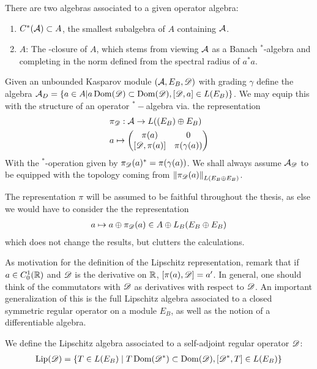 \begin{remark}
	There are two \Cstar algebras associated to a given operator algebra:
	\begin{enumerate}
	\item
	$C^*(\mathcal{A})\subset A$, the smallest subalgebra of $A$ containing $\mathcal{A}$. 
	\item
	$A$: The \Cstar-closure of $A$, which stems from viewing $\mathcal{A}$ as a Banach $^*$-algebra and completing in the norm defined from the spectral radius of $a^*a$. 
	\end{enumerate}
\end{remark}
\begin{definition}
Given an unbounded Kasparov module $(\mathcal{A},E_B,\mathscr{D})$ with grading $\gamma$ define the algebra $\mathcal{A}_D=\{a\in A| a\operatorname{Dom}(\mathscr{D}) \subset \operatorname{Dom}(\mathscr{D}), [\mathscr{D},a]\in L(E_B)\}$. We may equip this with the structure of an operator $^*-$algebra via. the representation 
\begin{align*}
	&\pi_{\D}:\A\to L((E_B)\osum E_B) \\
	&a\mapsto \begin{pmatrix} \pi(a) & 0 \\ [\D,\pi(a)] & \pi(\gamma(a)) \end{pmatrix}
\end{align*} 
With the $^*$-operation given by $\pi_{\mathscr{D}}(a)^*=\pi(\gamma(a))$.  We shall always assume $\mathcal{A}_{\mathscr{D}}$ to be equipped with the topology coming from $\left \Vert \pi_{\mathscr{D}}(a) \right \Vert_{L(E_B\oplus E_B)}$. 
\end{definition}
\begin{assumption}
	The representation $\pi$ will be assumed to be faithful throughout the thesis, as else we would have to consider the the representation 
	\begin{align*}
		a\mapsto a\oplus \pi_{\mathscr{D}}(a) \in A\oplus L_B(E_B\oplus E_B)
	\end{align*}
	which does not change the results, but clutters the calculations. 
\end{assumption}
As motivation for the definition of the Lipschitz representation, remark that if $a\in C_0^1(\mathbb{R})$ and $\mathscr{D}$ is the derivative on $\mathbb{R}$, $[\pi(a),\mathscr{D}]=a'$. In general, one should think of the commutators with $\mathscr{D}$ as derivatives with respect to $\mathscr{D}$. 
An important generalization of this is the full Lipschitz algebra associated to a closed symmetric regular operator on a \Cstar module $E_B$, as well as the notion of a differentiable algebra. 
\begin{definition}
We define the Lipschitz algebra associated to a self-adjoint regular operator $\mathscr{D}$:
\begin{align*}
	\operatorname{Lip}(\mathscr{D})=\{T\in L(E_B) \mid T\operatorname{Dom}(\mathscr{D}^*)\subset \operatorname{Dom}(\mathscr{D}), [\mathscr{D}^*,T]\in L(E_B)\}
\end{align*}
\end{definition}
